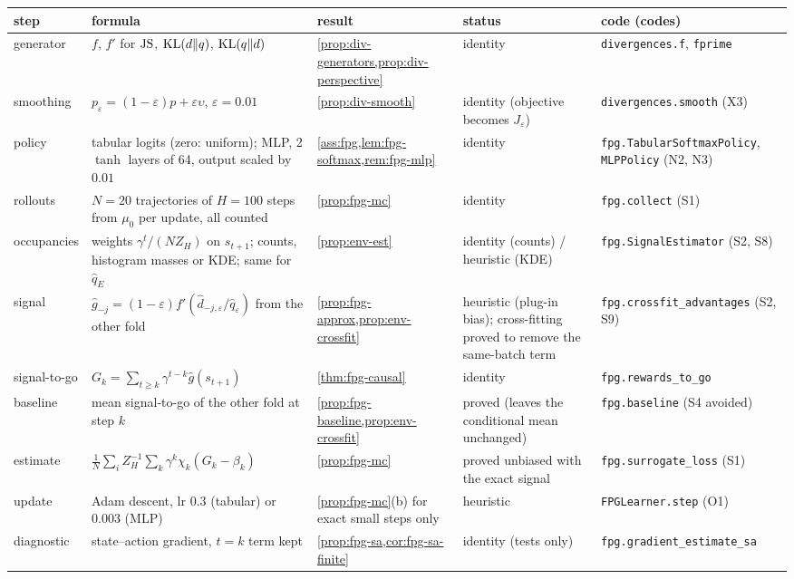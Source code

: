 {\small
\begin{longtable}{@{}>{\raggedright\arraybackslash}p{1.8cm}>{\raggedright\arraybackslash}p{3.9cm}>{\raggedright\arraybackslash}p{2.9cm}>{\raggedright\arraybackslash}p{1.9cm}>{\raggedright\arraybackslash\footnotesize}p{3.5cm}@{}}
\toprule
step & formula & result & status & code (codes)\\
\midrule\endhead
\bottomrule\endfoot
generator & $f$, $f'$ for $\mathrm{JS}$, $\mathrm{KL}(d\Vert q)$, $\mathrm{KL}(q\Vert d)$ & \cref{prop:div-generators,prop:div-perspective} & identity & \nolinkurl{divergences.f}, \nolinkurl{fprime}\\
smoothing & $p_\varepsilon=(1-\varepsilon)p+\varepsilon\upsilon$, $\varepsilon=0.01$ & \cref{prop:div-smooth} & identity (objective becomes $J_\varepsilon$) & \nolinkurl{divergences.smooth} (X3)\\
policy & tabular logits (zero: uniform); MLP, 2 $\tanh$ layers of 64, output scaled by $0.01$ & \cref{ass:fpg,lem:fpg-softmax,rem:fpg-mlp} & identity & \nolinkurl{fpg.TabularSoftmaxPolicy}, \nolinkurl{MLPPolicy} (N2, N3)\\
rollouts & $N=20$ trajectories of $H=100$ steps from $\mu_0$ per update, all counted & \cref{prop:fpg-mc} & identity & \nolinkurl{fpg.collect} (S1)\\
occupancies & weights $\gamma^t/(NZ_H)$ on $s_{t+1}$; counts, histogram masses or KDE; same for $\hat q_E$ & \cref{prop:env-est} & identity (counts) / heuristic (KDE) & \nolinkurl{fpg.SignalEstimator} (S2, S8)\\
signal & $\hat g_{-j}=(1-\varepsilon)f'(\hat d_{-j,\varepsilon}/\hat q_\varepsilon)$ from the other fold & \cref{prop:fpg-approx,prop:env-crossfit} & heuristic (plug-in bias); cross-fitting proved to remove the same-batch term & \nolinkurl{fpg.crossfit_advantages} (S2, S9)\\
signal-to-go & $G_k=\sum_{t\ge k}\gamma^{t-k}\hat g(s_{t+1})$ & \cref{thm:fpg-causal} & identity & \nolinkurl{fpg.rewards_to_go}\\
baseline & mean signal-to-go of the other fold at step $k$ & \cref{prop:fpg-baseline,prop:env-crossfit} & proved (leaves the conditional mean unchanged) & \nolinkurl{fpg.baseline} (S4 avoided)\\
estimate & $\frac1N\sum_iZ_H^{-1}\sum_k\gamma^k\chi_k(G_k-\beta_k)$ & \cref{prop:fpg-mc} & proved unbiased with the exact signal & \nolinkurl{fpg.surrogate_loss} (S1)\\
update & Adam descent, lr $0.3$ (tabular) or $0.003$ (MLP) & \cref{prop:fpg-mc}(b) for exact small steps only & heuristic & \nolinkurl{FPGLearner.step} (O1)\\
diagnostic & state--action gradient, $t=k$ term kept & \cref{prop:fpg-sa,cor:fpg-sa-finite} & identity (tests only) & \nolinkurl{fpg.gradient_estimate_sa}\\
\end{longtable}}

